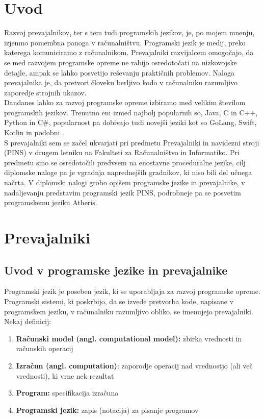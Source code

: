 \documentclass[a4paper, 12p]{book}
\begin{document}
\mainmatter
\setcounter{page}{1}
\pagestyle{fancy}

\chapter{Uvod}

Razvoj prevajalnikov, ter s tem tudi programskih jezikov, je, po mojem mnenju, izjemno pomembna panoga v računalništvu. Programski jezik je medij, preko katerega komuniciramo z računalnikom. Prevajalniki razvijalcem omogočajo, da se med razvojem programske opreme ne rabijo osredotočati na nizkovojske detajle, ampak se lahko posvetijo reševanju praktičnih problemov. Naloga prevajalnika je, da pretvori človeku berljivo kodo v računalniku razumljivo zaporedje strojnih ukazov. \\
\indent Dandanes lahko za razvoj programske opreme izbiramo med velikim številom programskih jezikov. Trenutno eni izmed najbolj popularnih so, Java, C in C++, Python in C\#, popularnost pa dobivajo tudi novejši jeziki kot so GoLang, Swift, Kotlin in podobni \cite{tiobeIndex}. \\
\indent S prevajalniki sem se začel ukvarjati pri predmetu Prevajalniki in navidezni stroji (PINS) v drugem letniku na Fakulteti za Računalništvo in Informatiko. Pri predmetu smo se osredotočili predvsem na enostavne proceduralne jezike, cilj diplomske naloge pa je vgradnja naprednejših gradnikov, ki niso bili del učnega načrta. V diplomski nalogi grobo opišem programske jezike in prevajalnike, v nadaljevanju predstavim programski jezik PINS, podrobneje pa se posvetim programskemu jeziku Atheris.

\chapter{Prevajalniki}
\label{ch0}

\section{Uvod v  programske jezike in prevajalnike}

Programski jezik je poseben jezik, ki se uporabljaja za razvoj programske opreme. Programski sistemi, ki poskrbijo, da se izvede pretvorba kode, napisane v programskem jeziku, v računalniku razumljivo obliko, se imenujejo prevajalniki. \\
Nekaj definicij:
\begin{enumerate}  
	\item \textbf{Računski model (angl. computational model):} zbirka vrednosti in računskih operacij 
	\item \textbf{Izračun (angl. computation)}: zaporodje operacij nad vrednostjo (ali več vrednosti), ki vrne nek rezultat
	\item \textbf{Program:} specifikacija izračuna
	\item \textbf{Programski jezik:} zapis (notacija) za pisanje programov
\end{enumerate}
\end{document}
